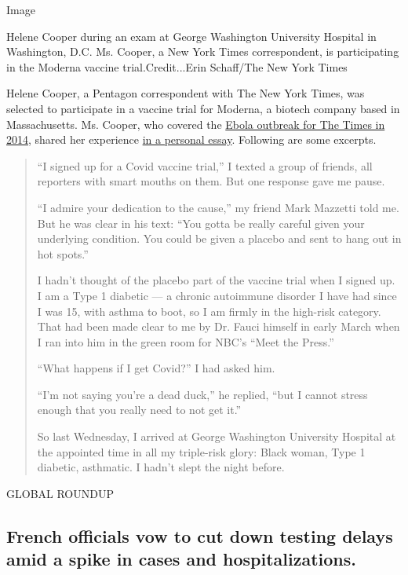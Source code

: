 Image

Helene Cooper during an exam at George Washington University Hospital in
Washington, D.C. Ms. Cooper, a New York Times correspondent, is
participating in the Moderna vaccine trial.Credit...Erin Schaff/The New
York Times

Helene Cooper, a Pentagon correspondent with The New York Times, was
selected to participate in a vaccine trial for Moderna, a biotech
company based in Massachusetts. Ms. Cooper, who covered the
\href{https://www.nytimes3xbfgragh.onion/interactive/2015/04/20/world/africa/ebola-coverage-pulitzer.html}{Ebola
outbreak for The Times in 2014}, shared her experience
\href{https://www.nytimes3xbfgragh.onion/2020/09/11/us/politics/coronavirus-vaccine-first-person.html}{in
a personal essay}. Following are some excerpts.

\begin{quote}
``I signed up for a Covid vaccine trial,'' I texted a group of friends,
all reporters with smart mouths on them. But one response gave me pause.

``I admire your dedication to the cause,'' my friend Mark Mazzetti told
me. But he was clear in his text: ``You gotta be really careful given
your underlying condition. You could be given a placebo and sent to hang
out in hot spots.''

I hadn't thought of the placebo part of the vaccine trial when I signed
up. I am a Type 1 diabetic --- a chronic autoimmune disorder I have had
since I was 15, with asthma to boot, so I am firmly in the high-risk
category. That had been made clear to me by Dr. Fauci himself in early
March when I ran into him in the green room for NBC's ``Meet the
Press.''

``What happens if I get Covid?'' I had asked him.

``I'm not saying you're a dead duck,'' he replied, ``but I cannot stress
enough that you really need to not get it.''

So last Wednesday, I arrived at George Washington University Hospital at
the appointed time in all my triple-risk glory: Black woman, Type 1
diabetic, asthmatic. I hadn't slept the night before.
\end{quote}

GLOBAL ROUNDUP

\hypertarget{french-officials-vow-to-cut-down-testing-delays-amid-a-spike-in-cases-and-hospitalizations}{%
\subsection{French officials vow to cut down testing delays amid a spike
in cases and
hospitalizations.}\label{french-officials-vow-to-cut-down-testing-delays-amid-a-spike-in-cases-and-hospitalizations}}

